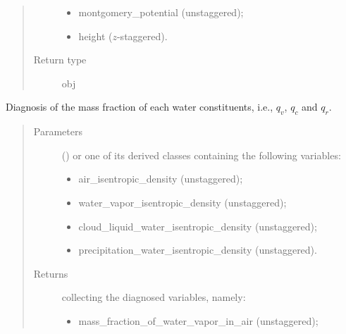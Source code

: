 \documentclass[letterpaper,10pt,english]{sphinxmanual}
\begin{document}
\begin{fulllineitems}
\begin{fulllineitems}
\begin{quote}
\begin{description}
\begin{itemize}
\item {} 
montgomery\_potential (unstaggered);

\item {} 
height (\(z\)-staggered).

\end{itemize}


\item[{Return type}] \leavevmode
obj

\end{description}\end{quote}

\end{fulllineitems}


\begin{fulllineitems}
\label{\detokenize{api:dycore.diagnostic_isentropic.DiagnosticIsentropic.get_mass_fraction_of_water_constituents_in_air}}
Diagnosis of the mass fraction of each water constituents, i.e., \(q_v\), \(q_c\) and \(q_r\).
\begin{quote}\begin{description}
\item[{Parameters}] \leavevmode
{} () \textendash{} 
{\hyperref[\detokenize{api:storages.grid_data.GridData}]{}} or one of its derived classes containing the following variables:
\begin{itemize}
\item {} 
air\_isentropic\_density (unstaggered);

\item {} 
water\_vapor\_isentropic\_density (unstaggered);

\item {} 
cloud\_liquid\_water\_isentropic\_density (unstaggered);

\item {} 
precipitation\_water\_isentropic\_density (unstaggered).

\end{itemize}


\item[{Returns}] \leavevmode

{\hyperref[\detokenize{api:storages.grid_data.GridData}]{}} collecting the diagnosed variables, namely:
\begin{itemize}
\item {} 
mass\_fraction\_of\_water\_vapor\_in\_air (unstaggered);


\end{itemize}
\end{description}
\end{quote}
\end{fulllineitems}
\end{fulllineitems}
\end{document}
